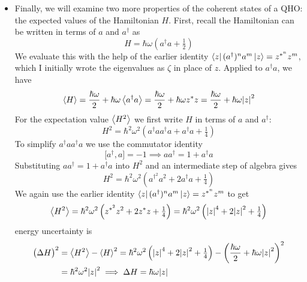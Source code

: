 \documentclass[11pt, a4paper]{article}
\begin{document}
\begin{itemize}
	\item Finally, we will examine two more properties of the coherent states of a QHO: the expected values of the Hamiltonian $ H $. First, recall the Hamiltonian can be written in terms of $ a $ and $ a^{\dagger} $ as
	\begin{equation*}
		H = \hbar \omega\left(a^{\dagger}a + \tfrac{1}{2}\right)
	\end{equation*}
	We evaluate this with the help of the earlier identity $ 		\bra{z}(a^{\dagger})^{n}a^{m}\ket{z} = z^{*^{n}}z^{m} $, which I initially wrote the eigenvalues as $ \zeta $ in place of $ z $. Applied to $ a^{\dagger}a $, we have
	\begin{equation*}
		\ev{H} = \frac{\hbar \omega}{2} + \hbar \omega \ev{a^{\dagger}a} = \frac{\hbar \omega}{2} + \hbar \omega z^{*}z = \frac{\hbar \omega}{2} + \hbar \omega \abs{z}^{2}
	\end{equation*}
	For the expectation value $ \ev{H^{2}} $ we first write $ H $ in terms of $ a  $ and $ a^{\dagger} $: 
	\begin{equation*}
		H^{2} = \hbar^{2} \omega^{2}\left(a^{\dagger}aa^{\dagger}a + a^{\dagger}a + \tfrac{1}{4}\right)
	\end{equation*}
	To simplify $ a^{\dagger}aa^{\dagger}a $ we use the commutator identity
	\begin{equation*}
		\big[a^{\dagger}, a\big] = -1 \implies aa^{\dagger} = 1 + a^{\dagger}a
	\end{equation*}
	Substituting $ aa^{\dagger} = 1 + a^{\dagger}a $  into $ H^{2} $ and an intermediate step of algebra gives
	\begin{equation*}
		H^{2} = \hbar^{2} \omega^{2}\left(a^{\dagger^{2}}a^{2} + 2a^{\dagger}a + \tfrac{1}{4}\right)
	\end{equation*}
	We again use the earlier identity $ 		\bra{z}(a^{\dagger})^{n}a^{m}\ket{z} = z^{*^{n}}z^{m} $ to get
	\begin{equation*}
		\ev{H^{2}} = \hbar^{2} \omega^{2} \left(z^{*^{2}}z^{2} + 2z^{*}z + \tfrac{1}{4}\right) = \hbar^{2} \omega^{2} \left(\abs{z}^{4} + 2\abs{z}^{2} + \tfrac{1}{4}\right)
	\end{equation*}
	 energy uncertainty is
	\begin{align*}
		\big(\Delta H\big)^{2} &= \ev{H^{2}} - \ev{H}^{2} = \hbar^{2} \omega^{2} \left(\abs{z}^{4} + 2\abs{z}^{2} + \tfrac{1}{4}\right) - \left(\frac{\hbar \omega}{2} + \hbar \omega \abs{z}^{2}\right)^{2}\\
		&= \hbar^{2}\omega^{2}\abs{z}^{2} \implies \Delta H = \hbar \omega \abs{z}
	\end{align*}
	

\end{itemize}
\end{document}
